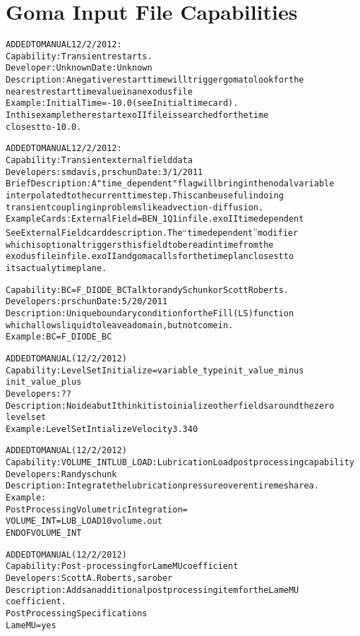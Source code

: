 \documentclass{article}
\begin{document}
\section{Goma Input File Capabilities}
\begin{alltt}


ADDED TO MANUAL 12/2/2012:
Capability: Transient restarts.  
Developer: Unknown  Date: Unknown
Description: A negative restart time will trigger goma to look for the
  nearest restart time value in an exodus file
Example:    Initial Time = -10.0  (see Initial time card).   
  In this example the restart exoII file is searched for the time
  closest to -10.0. 

ADDED TO MANUAL 12/2/2012:
Capability: Transient external field data
Developers: smdavis, prschun  Date: 3/1/2011
Brief Description: A "time_dependent" flag will bring in the nodal variable  
  interpolated to the current time step.   This can be useful in doing 
  transient coupling in problems like advection-diffusion. 
Example Cards: External Field = BEN_1 Q1 infile.exoII timedependent  
  See External Field card description.  The ``timedependent'' modifier
  which is optional triggers this field to be read in time from the
  exodus file infile.exoII and goma calls for the time plan closest to
  its actualy time plane.  

Capability: BC = F_DIODE_BC    Talk to randy Schunk or Scott Roberts. 
Developers: prschun   Date: 5/20/2011
Description: Unique boundary condition for the Fill (LS) function
  which allows liquid to leave a domain, but not come in.  
Example: BC = F_DIODE_BC

ADDED TO MANUAL (12/2/2012)
Capability: Level Set Initialize = variable_type init_value_minus 
init_value_plus
Developers: ??
Description: No idea but I think it is to inialize other fields around the zero
level set
Example: Level Set Intialize Velocity 3.34 0  

ADDED TO MANUAL (12/2/2012)
Capability: VOLUME_INT LUB_LOAD: Lubrication Load post processing capability 
Developers: Randy schunk
Description:  Integrate the lubrication pressure over entire mesh area.  
Example: 
Post Processing Volumetric Integration =
VOLUME_INT = LUB_LOAD 1 0 volume.out
END OF VOLUME_INT

ADDED TO MANUAL (12/2/2012)
Capability:  Post-processing for Lame MU coefficient
Developers:  Scott A. Roberts, sarober
Description:  Adds an additional post processing item for the Lame MU
coefficient.
Post Processing Specifications
Lame MU = yes


\end{alltt}
\end{document}
